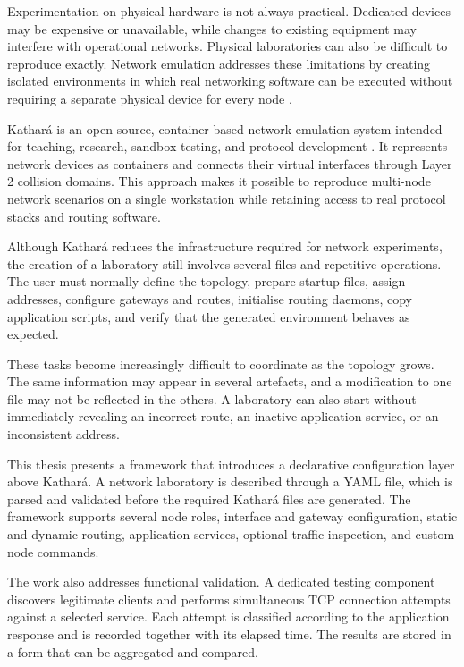 \documentclass[a4paper,10pt,titlepage,twoside]{book}
\numberwithin{equation}{chapter}
\theoremstyle{plain}
\theoremstyle{definition}
\begin{document}
Experimentation on physical hardware is not always practical. Dedicated
devices may be expensive or unavailable, while changes to existing equipment
may interfere with operational networks. Physical laboratories can also be
difficult to reproduce exactly. Network emulation addresses these limitations
by creating isolated environments in which real networking software can be
executed without requiring a separate physical device for every node
\cite{lantz2010network}.

Kathar\'a is an open-source, container-based network emulation system intended
for teaching, research, sandbox testing, and protocol development
\cite{kathara_website,scazzariello2020kathara,bonofiglio2018kathara}. It represents network devices as
containers and connects their virtual interfaces through Layer 2 collision
domains. This approach makes it possible to reproduce multi-node network
scenarios on a single workstation while retaining access to real protocol
stacks and routing software.

Although Kathar\'a reduces the infrastructure required for network
experiments, the creation of a laboratory still involves several files and
repetitive operations. The user must normally define the topology, prepare
startup files, assign addresses, configure gateways and routes, initialise
routing daemons, copy application scripts, and verify that the generated
environment behaves as expected.

These tasks become increasingly difficult to coordinate as the topology grows.
The same information may appear in several artefacts, and a modification to
one file may not be reflected in the others. A laboratory can also start
without immediately revealing an incorrect route, an inactive application
service, or an inconsistent address.

This thesis presents a framework that introduces a declarative configuration
layer above Kathar\'a. A network laboratory is described through a YAML file,
which is parsed and validated before the required Kathar\'a files are
generated. The framework supports several node roles, interface and gateway
configuration, static and dynamic routing, application services, optional
traffic inspection, and custom node commands.

The work also addresses functional validation. A dedicated testing component
discovers legitimate clients and performs simultaneous TCP connection attempts
against a selected service. Each attempt is classified according to the
application response and is recorded together with its elapsed time. The
results are stored in a form that can be aggregated and compared.
\end{document}
